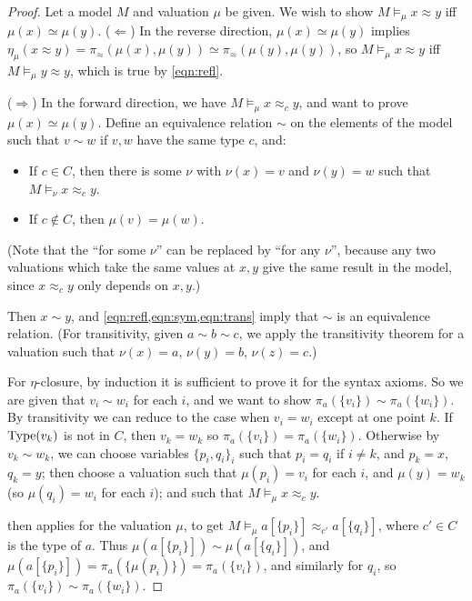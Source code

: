 \documentclass[runningheads,a4paper]{llncs}
\newcommand{\type}{{\rm Type}}
\begin{document}
\begin{proof}
Let a model $M$ and valuation $\mu$ be given. We wish to show $M\models_\mu x\approx y$ iff $\mu(x)\simeq\mu(y)$. ($\Leftarrow$) In the reverse direction, $\mu(x)\simeq\mu(y)$ implies $\eta_\mu(x\approx y)=\pi_\approx(\mu(x),\mu(y))\simeq\pi_\approx(\mu(y),\mu(y))$, so $M\models_\mu x\approx y$ iff $M\models_\mu y\approx y$, which is true by \autoref{eqn:refl}.

($\Rightarrow$) In the forward direction, we have $M\models_\mu x\approx_c y$, and want to prove $\mu(x)\simeq\mu(y)$.  Define an equivalence relation $\sim$ on the elements of the model such that $v\sim w$ if $v,w$ have the same type $c$, and:
\begin{itemize}
  \item If $c\in C$, then there is some $\nu$ with $\nu(x)=v$ and $\nu(y)=w$ such that $M\models_\nu x\approx_c y$.
  \item If $c\notin C$, then $\mu(v)=\mu(w)$.
\end{itemize}
(Note that the ``for some $\nu$'' can be replaced by ``for any $\nu$'', because any two valuations which take the same values at $x,y$ give the same result in the model, since $x\approx_c y$ only depends on $x,y$.)

Then $x\sim y$, and \cref{eqn:refl,eqn:sym,eqn:trans} imply that $\sim$ is an equivalence relation. (For transitivity, given $a\sim b\sim c$, we apply the transitivity theorem for a valuation such that $\nu(x)=a$, $\nu(y)=b$, $\nu(z)=c$.)

For $\eta$-closure, by induction it is sufficient to prove it for the syntax axioms. So we are given that $v_i\sim w_i$ for each $i$, and we want to show $\pi_a(\{v_i\})\sim\pi_a(\{w_i\})$. By transitivity we can reduce to the case when $v_i=w_i$ except at one point $k$. If $\type(v_k)$ is not in $C$, then $v_k=w_k$ so $\pi_a(\{v_i\})=\pi_a(\{w_i\})$. Otherwise by $v_k\sim w_k$, we can choose variables $\{p_i,q_i\}_i$ such that $p_i=q_i$ if $i\ne k$, and $p_k=x$, $q_k=y$; then choose a valuation such that $\mu(p_i)=v_i$ for each $i$, and $\mu(y)=w_k$ (so $\mu(q_i)=w_i$ for each $i$); and such that $M\models_\mu x\approx_c y$.

 then applies for the valuation $\mu$, to get $M\models_\mu a[\{p_i\}]\approx_{c'} a[\{q_i\}]$, where $c'\in C$ is the type of $a$. Thus $\mu(a[\{p_i\}])\sim\mu(a[\{q_i\}])$, and $\mu(a[\{p_i\}])=\pi_a(\{\mu(p_i)\})=\pi_a(\{v_i\})$, and similarly for $q_i$, so $\pi_a(\{v_i\})\sim\pi_a(\{w_i\})$.


\end{proof}
\end{document}
